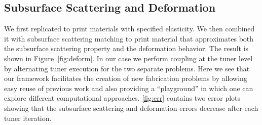 \documentclass[annual]{acmsiggraph}
\begin{document}
\subsection{Subsurface Scattering and Deformation}
We first replicated \cite{Bickel:2010} to print materials with specified elasticity. We then combined it with subsurface scattering
matching to print material that approximates both the subsurface scattering property and the deformation behavior. The result is shown in Figure~\ref{fig:deform}. In our case we perform coupling at the tuner level by alternating tuner execution for the two
separate problems. Here we see that our framework facilitates the creation of new fabrication problems by allowing easy reuse of previous work and also providing a ``playground'' in which one can explore different computational approaches. \autoref{fig:err} contains two error plots showing that the subsurface scattering and deformation errors decrease after each tuner iteration.


\end{document}
